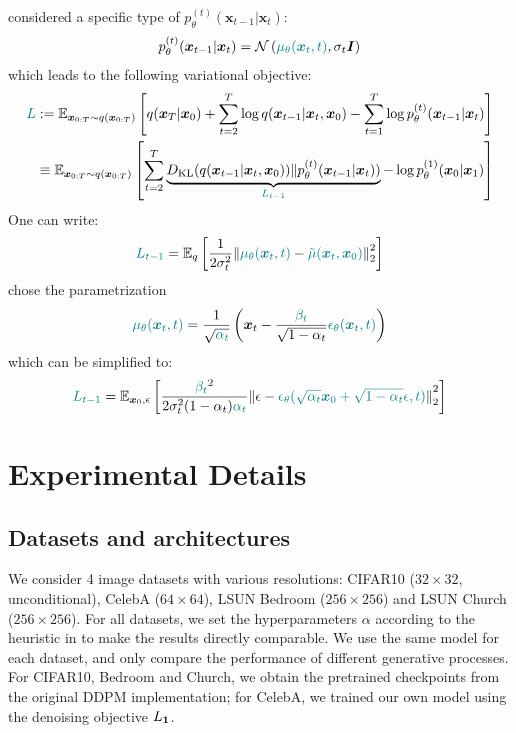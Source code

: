 \citet{ho2020denoising} considered a specific type of $p_\theta^{(t)}(\bm{x}_{t-1} | \bm{x}_t)$:
\begin{align}
    p_\theta^{(t)}(\bm{x}_{t-1} | \bm{x}_t) = \mathcal{N}\left({\color{teal} \mu_\theta(\bm{x}_t, t)}, \sigma_t \bm{I}\right)
\end{align}
which leads to the following variational objective:
\begin{align}
   {\color{teal} L} & := {\mathbb{E}}_{\bm{x}_{0:T} \sim q(\bm{x}_{0:T})} \left[q(\bm{x}_T | \bm{x}_0) + \sum_{t=2}^{T} \log q(\bm{x}_{t-1} | \bm{x}_t, \bm{x}_0) - \sum_{t=1}^{T} \log p_\theta^{(t)}(\bm{x}_{t-1} | \bm{x}_t) \right] \\
   & \equiv {\mathbb{E}}_{\bm{x}_{0:T} \sim q(\bm{x}_{0:T})} \left[\sum_{t=2}^{T} \underbrace{D_{\mathrm{KL}}(q(\bm{x}_{t-1} | \bm{x}_t, \bm{x}_0)) \Vert p_\theta^{(t)}(\bm{x}_{t-1} | \bm{x}_t))}_{\color{teal} L_{t-1}} - \log p_\theta^{(1)}(\bm{x}_0 | \bm{x}_1) \right] \nonumber
\end{align}
One can write:
\begin{align}
    {\color{teal} L_{t-1}} = {\mathbb{E}}_q\left[\frac{1}{2\sigma_t^2} {\lVert {{\color{teal} \mu_\theta(\bm{x}_t, t)} - {\color{teal} \tilde{\mu}(\bm{x}_t, \bm{x}_0)}} \rVert}_2^2\right]
\end{align}
\citet{ho2020denoising} chose the parametrization
\begin{align}
    {\color{teal} \mu_\theta(\bm{x}_t, t)} = \frac{1}{\sqrt{{\color{teal} \alpha_t}}} \left(\bm{x}_t - \frac{{\color{teal} \beta_t}}{\sqrt{1 - \alpha_t}} {\color{teal} \epsilon_\theta(\bm{x}_t, t)}\right)
\end{align}
which can be simplified to:
\begin{align}
    {\color{teal} L_{t-1}} = {\mathbb{E}}_{\bm{x}_0, \epsilon}\left[\frac{{\color{teal} \beta_t}^2}{2\sigma_t^2 (1 - \alpha_t) {\color{teal} \alpha_t}} {\lVert {\epsilon - {\color{teal} \epsilon_\theta(\sqrt{\alpha_t} \bm{x}_0 + \sqrt{1 - \alpha_t} \epsilon, t)}} \rVert}_2^2\right]
\end{align}




\section{Experimental Details}
\label{app:exp}
\subsection{Datasets and architectures}
We consider 4 image datasets with various resolutions: CIFAR10 ($32 \times 32$, unconditional), CelebA ($64 \times 64$), LSUN Bedroom ($256 \times 256$) and LSUN Church ($256 \times 256$). For all datasets, we set the hyperparameters $\alpha$ according to the heuristic in \citep{ho2020denoising} to make the results directly comparable. We use the same model for each dataset, and only compare the performance of different generative processes. For CIFAR10, Bedroom and Church, we obtain the pretrained checkpoints from the original DDPM implementation; for CelebA, we trained our own model using the denoising objective $L_{\bm{1}}$.

